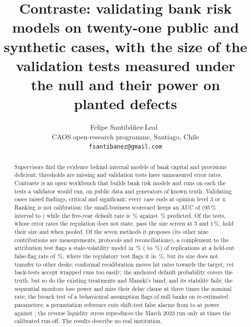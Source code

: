 \documentclass[11pt]{article}
\title{Contraste: validating bank risk models on twenty-one public and synthetic cases, with the size of the validation tests measured under the null and their power on planted defects}
\author{Felipe Santib\'a\~nez-Leal~\orcidlink{0000-0002-0150-3246}\\
\small CAOS open-research programme, Santiago, Chile\\
\small \texttt{fsantibanez@gmail.com}}
\date{\docdate}
\begin{document}
\maketitle
\headerblock

\begin{abstract}
Supervisors find the evidence behind internal models of bank capital and provisions deficient: thresholds are missing and validation tests have unmeasured error rates.
Contraste is an open workbench that builds bank risk models and runs on each the tests a validator would run, on public data and generators of known truth.
Validating \rsCasesResult{} cases raised \rsFindTotal{} findings, \rsFindSOne{} critical and \rsFindSTwo{} significant; every case ends at opinion level 3 or 4.
Ranking is not calibration: the small-business scorecard keeps an AUC of \rsCThreeAuc{} (95\,\% interval \rsCThreeAucLo{} to \rsCThreeAucHi{}) while the five-year default rate is \rsCThreeObs{}\,\% against \rsCThreePred{}\,\% predicted.
Of the \rsOneTests{} tests, whose error rates the regulation does not state, \rsCTwentyTwoWithin{} pass the size screen at 5 and 1\,\%, \pxPpOneHoldCell{} hold their size and \pxPpOneHold{} when pooled.
Of the seven methods it proposes (its other nine contributions are measurements, protocols and reconciliations), a complement to the attribution test flags a stale-volatility model in \rsThirteenUnion{}\,\% (\rsThirteenUnionLo{} to \rsThirteenUnionHi{}\,\%) of replications at a held-out false-flag rate of \rsThirteenHeldUnion{}\,\%, where the regulatory test flags it in \rsThirteenPla{}\,\%, but its size does not transfer to other desks;
conformal recalibration moves hit rates towards the target, yet back-tests accept wrapped runs too easily; the anchored default probability covers the truth, but so do the existing treatments and Manski's band, and its stability fails; the sequential monitors lose power and miss their delay clause at three times the nominal rate;
the breach test of a behavioural assumption flags \pxPpEightFitNull{} of null banks on re-estimated parameters; a permutation reference cuts shift-test false alarms from \pxPpTenFixedFive{} to \pxPpTenPerm{} at power \pxPpTenPermPower{} against \pxPpTenFixedPower{}; the reverse liquidity stress reproduces the March 2023 run only at \pxPpElevenSvbMult{} times the calibrated run-off.
The results describe no real institution.
\end{abstract}

\tableofcontents

























\end{document}
